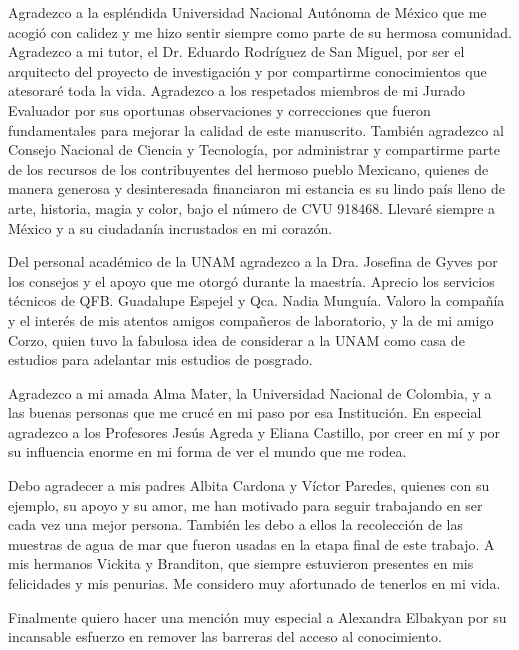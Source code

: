 \begin{acknowledgements}
Agradezco a la espléndida Universidad Nacional Autónoma de México que me acogió con calidez y me hizo sentir siempre como parte de su hermosa comunidad. Agradezco a mi tutor, el Dr. Eduardo Rodríguez de San Miguel, por ser el arquitecto del proyecto de investigación y por compartirme conocimientos que atesoraré toda la vida. Agradezco a los respetados miembros de mi Jurado Evaluador por sus oportunas observaciones y correcciones que fueron fundamentales para mejorar la calidad de este manuscrito. También agradezco al Consejo Nacional de Ciencia y Tecnología, por administrar y compartirme parte de los recursos de los contribuyentes del hermoso pueblo Mexicano, quienes de manera generosa y desinteresada financiaron mi estancia es su lindo país lleno de arte, historia, magia y color, bajo el número de CVU 918468. Llevaré siempre a México y a su ciudadanía incrustados en mi corazón. 

Del personal académico de la UNAM agradezco a la Dra. Josefina de Gyves por los consejos y el apoyo que me otorgó durante la maestría. Aprecio los servicios técnicos de QFB. Guadalupe Espejel y Qca. Nadia Munguía. Valoro la compañía y el interés de mis atentos amigos compañeros de laboratorio, y la de mi amigo Corzo, quien tuvo la fabulosa idea de considerar a la UNAM como casa de estudios para adelantar mis estudios de posgrado.

Agradezco a mi amada Alma Mater, la Universidad Nacional de Colombia, y a las buenas personas que me crucé en mi paso por esa Institución. En especial agradezco a los Profesores Jesús Agreda y Eliana Castillo, por creer en mí y por su influencia enorme en mi forma de ver el mundo que me rodea.

Debo agradecer a mis padres Albita Cardona y Víctor Paredes, quienes con su ejemplo, su apoyo y su amor, me han motivado para seguir trabajando en ser cada vez una mejor persona. También les debo a ellos la recolección de las muestras de agua de mar que fueron usadas en la etapa final de este trabajo. A mis hermanos Vickita y Branditon, que siempre estuvieron presentes en mis felicidades y mis penurias. Me considero muy afortunado de tenerlos en mi vida. 

Finalmente quiero hacer una mención muy especial a Alexandra Elbakyan por su incansable esfuerzo en remover las barreras del acceso al conocimiento. %
\end{acknowledgements}